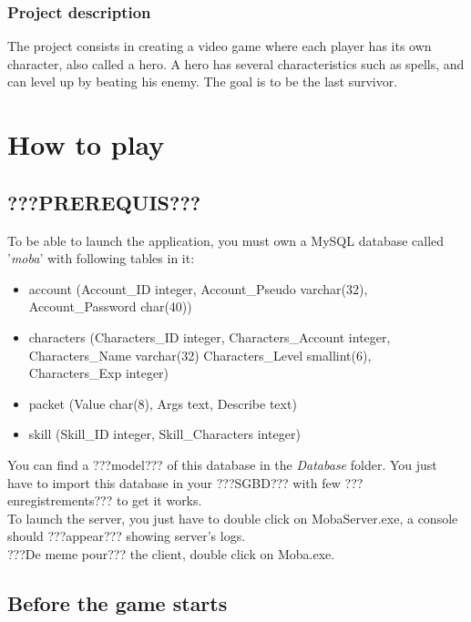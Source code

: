 \documentclass{scrreprt}
\begin{document}
		  \section{Project description} %
		  The project consists in creating a video game where each player has its own character, also 
		  called a hero. A hero has several characteristics such as %
		  spells, and can level up by beating his enemy. The goal is to be the last survivor.

		  \part{How to play}
		  \chapter{???PREREQUIS???}
		  To be able to launch the application, you must own a MySQL database called '\emph{moba}' with following tables in it:
		  \begin{itemize}
		  \item{account (Account\_ID integer, Account\_Pseudo varchar(32), Account\_Password char(40))}
		  \item{characters (Characters\_ID integer, Characters\_Account integer, Characters\_Name varchar(32) Characters\_Level smallint(6), Characters\_Exp integer)}
		  \item{packet (Value char(8), Args text, Describe text)}
		  \item{skill (Skill\_ID integer, Skill\_Characters integer)}
		  \end{itemize}

		  You can find a ???model??? of this database in the \emph{Database} folder. You just have to import this database in your ???SGBD??? with few ???enregistrements??? to get it works.\\

		  To launch the server, you just have to double click on MobaServer.exe, a console should ???appear??? showing server's logs.\\
		  ???De meme pour??? the client, double click on Moba.exe.

		  \chapter{Before the game starts}
\end{document}
